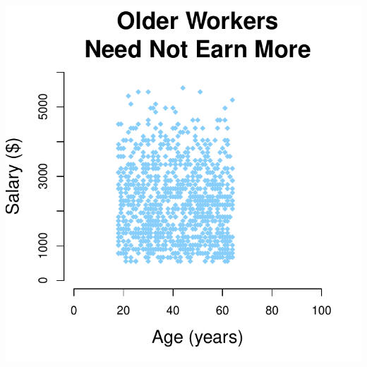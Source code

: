 \documentclass[aspectratio=169]{beamer}
\theoremstyle{principle}
\begin{document}
\begin{frame}
\begin{columns}
\begin{column}{0.5\textwidth}
\includegraphics[scale=0.5]{age_v_salary.pdf}
\end{column}

\end{columns}

\end{frame}

%
%
%
%
\end{document}
